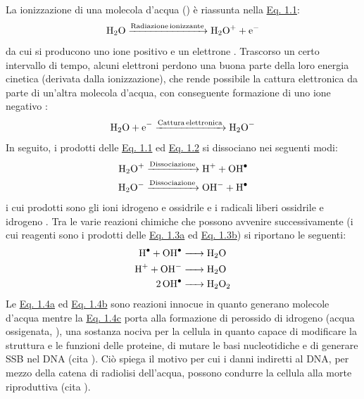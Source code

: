 \documentclass[12pt,a4paper,twoside]{report}
\begin{document}
	La ionizzazione di una molecola d'acqua () è riassunta nella \hyperref[eq:radiolisi1]{Eq. 1.1}:
	\begin{equation}
		\ce{H2O ->[Radiazione ionizzante] H2O^{+} + e^-}
		\label{eq:radiolisi1}
	\end{equation}
	da cui si producono uno ione positivo  e un elettrone . Trascorso un certo intervallo di tempo, alcuni elettroni perdono una buona parte della loro energia cinetica (derivata dalla ionizzazione), che rende possibile la cattura elettronica da parte di un'altra molecola d'acqua, con conseguente formazione di uno ione negativo :
	\begin{equation}
		\ce{H2O + e^{-} ->[Cattura elettronica] H2O^{-}}
		\label{eq:radiolisi2}
	\end{equation}
	In seguito, i prodotti delle \hyperref[eq:radiolisi1]{Eq. 1.1} ed \hyperref[eq:radiolisi2]{Eq. 1.2} si dissociano nei seguenti modi:
	\begin{subequations}
		\begin{align}
			\label{eq:dissociazione1}
			\ce{H2O^{+} ->[Dissociazione] H^{+} + OH^{.}}\\
			\label{eq:dissociazione2}
			\ce{H2O^{-} ->[Dissociazione] OH^{-} + H^{.}}
		\end{align}
	\end{subequations}
	i cui prodotti sono gli ioni idrogeno  e ossidrile  e i radicali liberi ossidrile  e idrogeno . Tra le varie reazioni chimiche che possono avvenire successivamente (i cui reagenti sono i prodotti delle \hyperref[eq:dissociazione1]{Eq. 1.3a} ed \hyperref[eq:dissociazione2]{Eq. 1.3b}) si riportano le seguenti:
	\begin{subequations}
		\begin{align}
			\label{eq:prodotto1}
			\ce{H^{.} + OH^{.} &-> H2O}\\
			\label{eq:prodotto2}
			\ce{H^{+} + OH^{-} &-> H2O}\\
			\label{eq:prodotto3}
			\ce{2OH^{.} &-> H2O2}
		\end{align}
	\end{subequations}
	Le \hyperref[eq:prodotto1]{Eq. 1.4a} ed \hyperref[eq:prodotto2]{Eq. 1.4b} sono reazioni innocue in quanto generano molecole d'acqua mentre la \hyperref[eq:prodotto3]{Eq. 1.4c} porta alla formazione di perossido di idrogeno (acqua ossigenata, ), una sostanza nociva per la cellula in quanto capace di modificare la struttura e le funzioni delle proteine, di mutare le basi nucleotidiche e di generare SSB nel DNA (cita
	). Ciò spiega il motivo per cui i danni indiretti al DNA, per mezzo della catena di radiolisi dell'acqua, possono condurre la cellula alla morte riproduttiva (cita
	).
	
\end{document}
